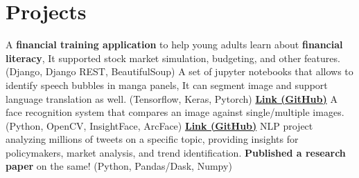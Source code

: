 \section{Projects}
  \resumeSubHeadingListStart
      {A \textbf{financial training application} to help young adults learn about \textbf{financial literacy}, It supported stock market simulation, budgeting, and other features. (Django, Django REST, BeautifulSoup)}
      {A set of jupyter notebooks that allows to identify speech bubbles in manga panels, It can segment image and support language translation as well. (Tensorflow, Keras, Pytorch) \href{https://github.com/hari01584/BubbleBoxModel-Notebook}{\textbf{Link (GitHub)}}}
      {A face recognition system that compares an image against single/multiple images. (Python, OpenCV, InsightFace, ArcFace) \href{https://github.com/hari01584/faceai-insightfaces}{\textbf{Link (GitHub)}}}
      {NLP project analyzing millions of tweets on a specific topic, providing insights for policymakers, market analysis, and trend identification. \textbf{Published a research paper} on the same! (Python, Pandas/Dask, Numpy)}
  \resumeSubHeadingListEnd